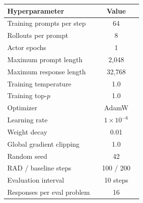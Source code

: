 \begin{minipage}[t]{0.47\linewidth}
\label{tab:shared-training-hparams}
\centering
\normalsize
\setlength{\tabcolsep}{5pt}
\renewcommand{\arraystretch}{1.0}
\begin{tabular}{@{}C{0.66\linewidth}c@{}}
\toprule
Hyperparameter & Value \\
\midrule
Training prompts per step & 64 \\
Rollouts per prompt & 8 \\
Actor epochs & 1 \\
Maximum prompt length & 2,048 \\
Maximum response length & 32,768 \\
Training temperature & 1.0 \\
Training top-\(p\) & 1.0 \\
Optimizer & AdamW \\
Learning rate & \(1\times10^{-6}\) \\
Weight decay & 0.01 \\
Global gradient clipping & 1.0 \\
Random seed & 42 \\
RAD / baseline steps & 100 / 200 \\
Evaluation interval & 10 steps \\
Responses per eval problem & 16 \\
\bottomrule
\end{tabular}
\end{minipage}
